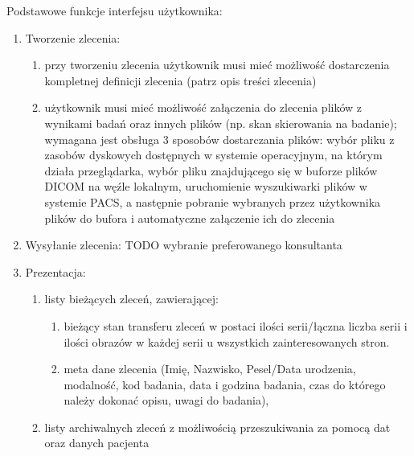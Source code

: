 \documentclass[a4paper]{report}
\begin{document}
Podstawowe funkcje interfejsu użytkownika:
\begin{enumerate}
  \item Tworzenie zlecenia:
      \begin{enumerate}
      \item przy tworzeniu zlecenia użytkownik musi mieć możliwość dostarczenia kompletnej definicji zlecenia (patrz opis treści zlecenia)
      \item użytkownik musi mieć możliwość załączenia do zlecenia plików z wynikami badań oraz innych plików (np. skan  skierowania na badanie); wymagana jest obsługa 3 sposobów dostarczania plików: wybór pliku z zasobów dyskowych dostępnych w systemie operacyjnym, na którym działa przeglądarka, wybór pliku znajdującego się w buforze plików DICOM na węźle lokalnym, uruchomienie wyszukiwarki plików w systemie PACS, a następnie pobranie wybranych przez użytkownika plików do bufora i automatyczne załączenie ich do zlecenia
      \end{enumerate}
  \item Wysyłanie zlecenia: TODO wybranie preferowanego konsultanta
  \item Prezentacja:
    \begin{enumerate}
      \item listy bieżących zleceń, zawierającej:
	  \begin{enumerate}
	  \item bieżący stan transferu zleceń w postaci ilości serii/łączna liczba serii i ilości obrazów w każdej serii u wszystkich zainteresowanych stron.
	  \item meta dane zlecenia (Imię, Nazwisko, Pesel/Data urodzenia, modalność, kod badania, data i godzina badania, czas do którego należy dokonać opisu, uwagi do badania),
	  \end{enumerate}
      \item listy archiwalnych zleceń z możliwością przeszukiwania za pomocą dat oraz danych pacjenta
    \end{enumerate}

\end{enumerate}
\end{document}
